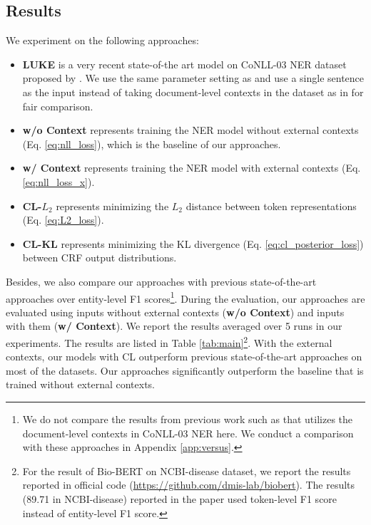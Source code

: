 \subsection{Results}
We experiment on the following approaches:
\begin{itemize}[leftmargin=*]
    \item {\sc\textbf{LUKE}} is a very recent state-of-the art model on CoNLL-03 NER dataset proposed by \citet{yamada-etal-2020-luke}. We use the same parameter setting as \citet{yamada-etal-2020-luke} and use a single sentence as the input instead of taking document-level contexts in the dataset as in \citet{yamada-etal-2020-luke} for fair comparison.
    \item {\sc\textbf{w/o Context}} represents training the NER model without external contexts (Eq. \ref{eq:nll_loss}), which is the baseline of our approaches. 
    \item {\sc\textbf{w/ Context}} represents training the NER model with external contexts (Eq. \ref{eq:nll_loss_x}). 
    \item {\sc\textbf{CL-$L_2$}} represents minimizing the $L_2$ distance between token representations (Eq. \ref{eq:L2_loss}).
    \item {\sc\textbf{CL-KL}} represents minimizing the KL divergence (Eq. \ref{eq:cl_posterior_loss}) between CRF output distributions.
\end{itemize}
Besides, we also compare our approaches with previous state-of-the-art approaches over entity-level F1 scores\footnote{We do not compare the results from previous work such as \citet{yu-etal-2020-named,luoma-pyysalo-2020-exploring,yamada-etal-2020-luke} that utilizes the document-level contexts in CoNLL-03 NER here. We conduct a comparison with these approaches in Appendix \ref{app:versus}. }.
During the evaluation, our approaches are evaluated using inputs without external contexts ({\sc\textbf{w/o Context}}) and inputs with them ({\sc\textbf{w/ Context}}). We report the results averaged over 5 runs in our experiments. The results are listed in Table \ref{tab:main}\footnote{For the result of Bio-BERT \citep{lee2020biobert} on NCBI-disease dataset, we report the results reported in official code (\url{https://github.com/dmis-lab/biobert}). The results (89.71 in NCBI-disease) reported in the paper used token-level F1 score instead of entity-level F1 score.}. With the external contexts, our models with CL outperform previous state-of-the-art approaches on most of the datasets. Our approaches significantly outperform the baseline that is trained without external contexts. 
